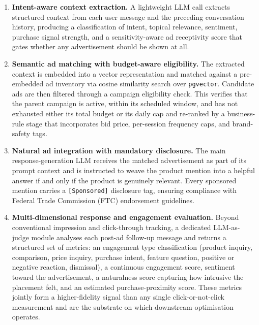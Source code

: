 \begin{enumerate}[label=(\roman*), leftmargin=2.5em]
  \item \textbf{Intent-aware context extraction.} A lightweight LLM call
    extracts structured context from each user message and the preceding
    conversation history, producing a classification of intent, topical
    relevance, sentiment, purchase signal strength, and a
    sensitivity-aware ad receptivity score that gates whether any advertisement
    should be shown at all.

  \item \textbf{Semantic ad matching with budget-aware eligibility.} The
    extracted context is embedded into a vector representation and matched
    against a pre-embedded ad inventory via cosine similarity search over
    \texttt{pgvector}. Candidate ads are then filtered through a campaign
    eligibility check. This verifies that the parent campaign is active, within
    its scheduled window, and has not exhausted either its total budget or
    its daily cap and re-ranked by a business-rule stage that incorporates
    bid price, per-session frequency caps, and brand-safety tags.

  \item \textbf{Natural ad integration with mandatory disclosure.} The main
    response-generation LLM receives the matched advertisement as part of its
    prompt context and is instructed to weave the product mention into a helpful
    answer if and only if the product is genuinely relevant. Every sponsored
    mention carries a \texttt{[Sponsored]} disclosure tag, ensuring compliance
    with Federal Trade Commission (FTC) endorsement guidelines.

  \item \textbf{Multi-dimensional response and engagement evaluation.} Beyond
    conventional impression and click-through tracking, a dedicated LLM-as-judge
    module analyses each post-ad follow-up message and returns a structured set
    of metrics: an engagement type classification (product inquiry, comparison,
    price inquiry, purchase intent, feature question, positive or negative
    reaction, dismissal), a continuous engagement score, sentiment toward the
    advertisement, a naturalness score capturing how intrusive the placement
    felt, and an estimated purchase-proximity score. These metrics jointly
    form a higher-fidelity signal than any single click-or-not-click
    measurement and are the substrate on which downstream optimisation
    operates.


\end{enumerate}
